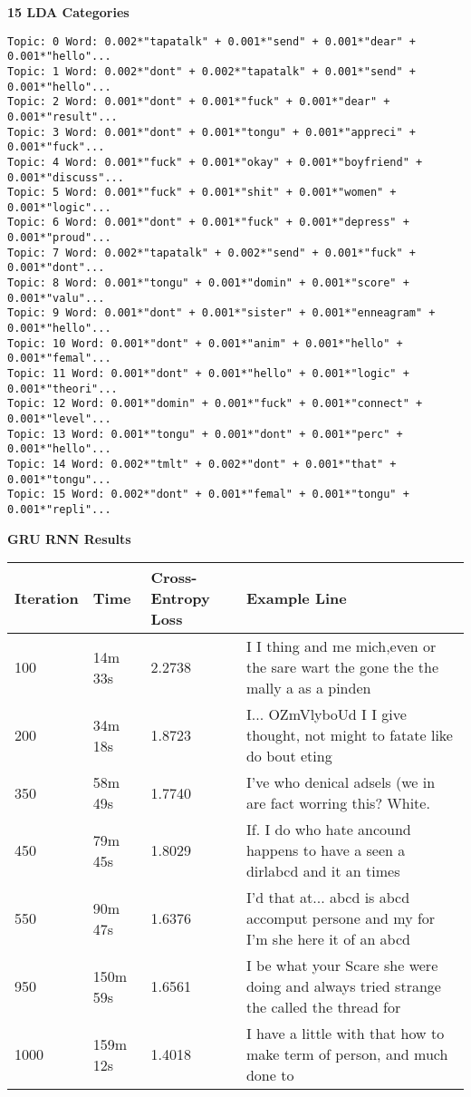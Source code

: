\documentclass{article}
\begin{document}
\textbf{15 LDA Categories}
\begin{verbatim}
Topic: 0 Word: 0.002*"tapatalk" + 0.001*"send" + 0.001*"dear" + 0.001*"hello"... 
Topic: 1 Word: 0.002*"dont" + 0.002*"tapatalk" + 0.001*"send" + 0.001*"hello"...
Topic: 2 Word: 0.001*"dont" + 0.001*"fuck" + 0.001*"dear" + 0.001*"result"...
Topic: 3 Word: 0.001*"dont" + 0.001*"tongu" + 0.001*"appreci" + 0.001*"fuck"...
Topic: 4 Word: 0.001*"fuck" + 0.001*"okay" + 0.001*"boyfriend" + 0.001*"discuss"...
Topic: 5 Word: 0.001*"fuck" + 0.001*"shit" + 0.001*"women" + 0.001*"logic"...
Topic: 6 Word: 0.001*"dont" + 0.001*"fuck" + 0.001*"depress" + 0.001*"proud"...
Topic: 7 Word: 0.002*"tapatalk" + 0.002*"send" + 0.001*"fuck" + 0.001*"dont"...
Topic: 8 Word: 0.001*"tongu" + 0.001*"domin" + 0.001*"score" + 0.001*"valu"...
Topic: 9 Word: 0.001*"dont" + 0.001*"sister" + 0.001*"enneagram" + 0.001*"hello"...
Topic: 10 Word: 0.001*"dont" + 0.001*"anim" + 0.001*"hello" + 0.001*"femal"...
Topic: 11 Word: 0.001*"dont" + 0.001*"hello" + 0.001*"logic" + 0.001*"theori"...
Topic: 12 Word: 0.001*"domin" + 0.001*"fuck" + 0.001*"connect" + 0.001*"level"...
Topic: 13 Word: 0.001*"tongu" + 0.001*"dont" + 0.001*"perc" + 0.001*"hello"...
Topic: 14 Word: 0.002*"tmlt" + 0.002*"dont" + 0.001*"that" + 0.001*"tongu"...
Topic: 15 Word: 0.002*"dont" + 0.001*"femal" + 0.001*"tongu" + 0.001*"repli"...
\end{verbatim}


\textbf{GRU RNN Results}
\begin{table}[h!]
\begin{tabular}{|l|l|l|l|}
\hline
Iteration & Time    & Cross-Entropy Loss & Example Line                                                                       \\ \hline
100       & 14m 33s & 2.2738             & I I thing and me mich,even or the sare wart the gone the the mally a as a pinden   \\ \hline
200       & 34m 18s & 1.8723             & I... OZmVlyboUd I I give thought, not might to fatate like do bout eting           \\ \hline
350       & 58m 49s & 1.7740             & I've who denical adsels (we in are fact worring this? White.                       \\ \hline
450       & 79m 45s & 1.8029             & If. I do who hate ancound happens to have a seen a dirlabcd and it an times        \\ \hline
550       & 90m 47s & 1.6376             & I'd that at... abcd is abcd accomput persone and my for I'm she here it of an abcd \\ \hline
950       & 150m 59s & 1.6561             & I be what your Scare she were doing and always tried strange the called the thread for \\ \hline
1000       & 159m 12s  & 1.4018             & I have a little with that how to make term of person, and much done to \\ \hline
\end{tabular}
\end{table}
\end{document}
